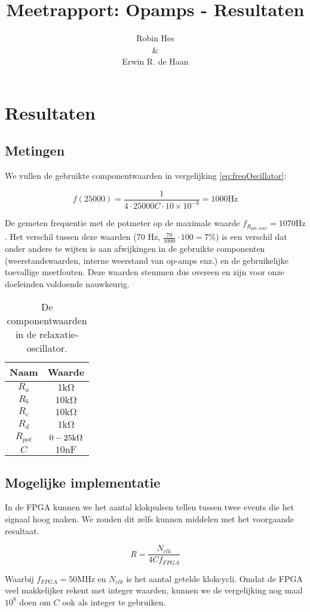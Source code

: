 \documentclass{report}
\title{Meetrapport: Opamps - Resultaten}
\author{Robin Hes\\\&\\Erwin R. de Haan}
\begin{document}
\chapter{Resultaten}
\section{Metingen}

We vullen de gebruikte componentwaarden in vergelijking \ref{eq:freqOscillator}:

$$f(25000) = \frac{1}{4\cdot 25000C \cdot 10 \times 10^{-9}} = 1000 \mathrm{Hz}$$

\noindent
De gemeten frequentie met de potmeter op de maximale waarde $f_{R_{pot,max}} = 1070 \mathrm{Hz}$. Het verschil tussen deze waarden (70 Hz, $\frac{70}{1000} \cdot 100 = 7\%$) is een verschil dat onder andere te wijten is aan afwijkingen in de gebruikte componenten (weerstandswaarden, interne weerstand van op-amps enz.) en de gebruikelijke toevallige meetfouten. Deze waarden stemmen dus overeen en zijn voor onze doeleinden voldoende nauwkeurig.

\begin{table}[H]
	\caption{De componentwaarden in de relaxatie-oscillator.}
	\label{tab:components}
	\centering
	\begin{tabular}{|c|c|}
		\hline
		Naam & Waarde\\
		\hline
		$R_a$ & $1 \mathrm{k\Omega}$\\
		\hline
		$R_b$ & $10 \mathrm{k\Omega}$\\
		\hline
		$R_c$ & $10 \mathrm{k\Omega}$\\
		\hline
		$R_d$ & $1 \mathrm{k\Omega}$\\
		\hline
		$R_{pot}$ & $0\--25 \mathrm{k\Omega}$\\
		\hline
		$C$ & $10 \mathrm{nF}$\\
		\hline
	\end{tabular}
\end{table}

\section{Mogelijke implementatie}

In de FPGA kunnen we het aantal klokpulsen tellen tussen twee events die het signaal hoog maken. We zouden dit zelfs kunnen middelen met het voorgaande resultaat.

\begin{equation}
	\label{eq:fpgaEq}
	R = \frac{N_{clk}}{4Cf_{FPGA}}
\end{equation}

\noindent
Waarbij $f_{FPGA} = 50 \mathrm{MHz}$ en $N_{clk}$ is het aantal getelde klokcycli. Omdat de FPGA veel makkelijker rekent met integer waarden, kunnen we de vergelijking nog maal $10^8$ doen om $C$ ook als integer te gebruiken.
\end{document}

